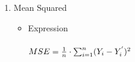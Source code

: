 \documentclass[11pt]{article}
\begin{document}
\begin{enumerate}
    \item Mean Squared
    \begin{itemize}
        \item Expression\\\\
        $MSE = \frac{1}{n} \cdot \sum_{i=1}^{n} (Y\sb{i} - Y\sp{'}\sb{i})^{2}$ 
    \end{itemize}
    


\end{enumerate}
\end{document}
